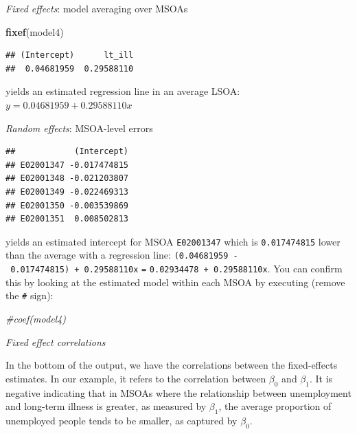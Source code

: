 \documentclass[]{book}
\newenvironment{Shaded}{\begin{snugshade}}{\end{snugshade}}
\newcommand{\KeywordTok}[1]{\textcolor[rgb]{0.13,0.29,0.53}{\textbf{#1}}}
\newcommand{\DecValTok}[1]{\textcolor[rgb]{0.00,0.00,0.81}{#1}}
\newcommand{\StringTok}[1]{\textcolor[rgb]{0.31,0.60,0.02}{#1}}
\newcommand{\CommentTok}[1]{\textcolor[rgb]{0.56,0.35,0.01}{\textit{#1}}}
\newcommand{\OperatorTok}[1]{\textcolor[rgb]{0.81,0.36,0.00}{\textbf{#1}}}
\newcommand{\NormalTok}[1]{#1}
\begin{document}
\emph{Fixed effects}: model averaging over MSOAs

\begin{Shaded}
\begin{Highlighting}[]
\KeywordTok{fixef}\NormalTok{(model4)}
\end{Highlighting}
\end{Shaded}

\begin{verbatim}
## (Intercept)      lt_ill 
##  0.04681959  0.29588110
\end{verbatim}

yields an estimated regression line in an average LSOA:
\(y = 0.04681959 + 0.29588110x\)

\emph{Random effects}: MSOA-level errors

\begin{Shaded}
\end{Shaded}

\begin{verbatim}
##            (Intercept)
## E02001347 -0.017474815
## E02001348 -0.021203807
## E02001349 -0.022469313
## E02001350 -0.003539869
## E02001351  0.008502813
\end{verbatim}

yields an estimated intercept for MSOA \texttt{E02001347} which is
\texttt{0.017474815} lower than the average with a regression line:
\texttt{(0.04681959\ -\ 0.017474815)\ +\ 0.29588110x} \texttt{=}
\texttt{0.02934478\ +\ 0.29588110x}. You can confirm this by looking at
the estimated model within each MSOA by executing (remove the
\texttt{\#} sign):

\begin{Shaded}
\begin{Highlighting}[]
\CommentTok{#coef(model4)}
\end{Highlighting}
\end{Shaded}

\emph{Fixed effect correlations}

In the bottom of the output, we have the correlations between the
fixed-effects estimates. In our example, it refers to the correlation
between \(\beta_{0}\) and \(\beta_{1}\). It is negative indicating that
in MSOAs where the relationship between unemployment and long-term
illness is greater, as measured by \(\beta_{1}\), the average proportion
of unemployed people tends to be smaller, as captured by \(\beta_{0}\).
\end{document}
